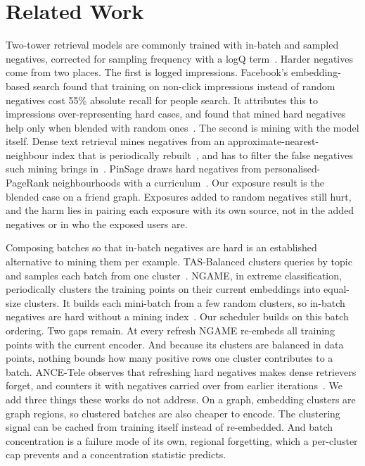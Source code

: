 \section{Related Work}
\label{sec:related}

 Two-tower retrieval models are commonly trained with in-batch and
sampled negatives, corrected for sampling frequency with a logQ term~\cite{yi2019sampling}. Harder negatives come from
two places. The first is logged impressions. Facebook's embedding-based search found that training on non-click
impressions instead of random negatives cost 55\% absolute recall for people search. It attributes this to impressions
over-representing hard cases, and found that mined hard negatives help only when blended with random
ones~\cite{huang2020ebr}. The second is mining with the model itself. Dense text retrieval mines negatives from an
approximate-nearest-neighbour index that is periodically rebuilt~\cite{xiong2021ance,karpukhin2020dpr}, and has to
filter the false negatives such mining brings in~\cite{qu2021rocketqa}. PinSage draws hard negatives from
personalised-PageRank neighbourhoods with a curriculum~\cite{ying2018graph}. Our exposure result is the blended case on
a friend graph. Exposures added to random negatives still hurt, and the harm lies in pairing each exposure with its own
source, not in the added negatives or in who the exposed users are.

 Composing batches so that in-batch negatives are hard is an established
alternative to mining them per example. TAS-Balanced clusters queries by topic and samples each batch from one
cluster~\cite{hofstatter2021tasb}. NGAME, in extreme classification, periodically clusters the training points on their
current embeddings into equal-size clusters. It builds each mini-batch from a few random clusters, so in-batch negatives
are hard without a mining index~\cite{dahiya2023ngame}. Our scheduler builds on this batch ordering. Two gaps remain.
At every refresh NGAME re-embeds all training points with the current encoder. And because its clusters are balanced in
data points, nothing bounds how many positive rows one cluster contributes to a batch. ANCE-Tele observes that
refreshing hard negatives makes dense retrievers forget, and counters it with negatives carried over from earlier
iterations~\cite{sun2022ancetele}. We add three things these works do not address. On a graph, embedding clusters are
graph regions, so clustered batches are also cheaper to encode. The clustering signal can be cached from training
itself instead of re-embedded. And batch concentration is a failure mode of its own, regional forgetting, which a
per-cluster cap prevents and a concentration statistic predicts.

